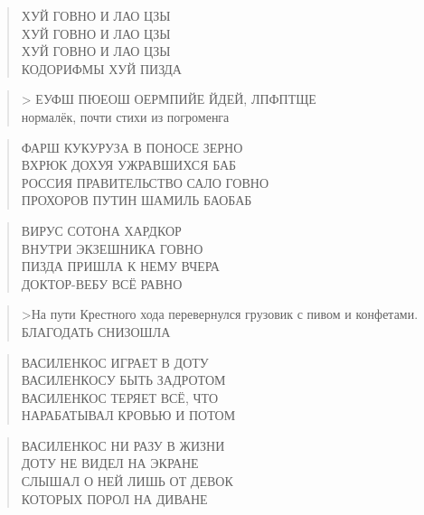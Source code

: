\poemtitle{***}
\begin{verse}
ХУЙ ГОВНО И ЛАО ЦЗЫ\\
ХУЙ ГОВНО И ЛАО ЦЗЫ\\
ХУЙ ГОВНО И ЛАО ЦЗЫ\\
КОДОРИФМЫ ХУЙ ПИЗДА
\end{verse}

\poemtitle{***}
\begin{verse}
> ЕУФШ ПЮЕОШ ОЕРМПИЙЕ ЙДЕЙ, ЛПФПТЩЕ\\
нормалёк, почти стихи из погроменга
\end{verse}

\poemtitle{***}
\begin{verse}
ФАРШ КУКУРУЗА В ПОНОСЕ ЗЕРНО\\
ВХРЮК ДОХУЯ УЖРАВШИХСЯ БАБ\\
РОССИЯ ПРАВИТЕЛЬСТВО САЛО ГОВНО\\
ПРОХОРОВ ПУТИН ШАМИЛЬ БАОБАБ
\end{verse}

\poemtitle{***}
\begin{verse}
ВИРУС СОТОНА ХАРДКОР\\
ВНУТРИ ЭКЗЕШНИКА ГОВНО\\
ПИЗДА ПРИШЛА К НЕМУ ВЧЕРА\\
ДОКТОР-ВЕБУ ВСЁ РАВНО
\end{verse}

\poemtitle{***}
\begin{verse}
>На пути Крестного хода перевернулся грузовик с пивом и конфетами.\\
БЛАГОДАТЬ СНИЗОШЛА
\end{verse}

\poemtitle{***}
\begin{verse}
ВАСИЛЕНКОС ИГРАЕТ В ДОТУ\\
ВАСИЛЕНКОСУ БЫТЬ ЗАДРОТОМ\\
ВАСИЛЕНКОС ТЕРЯЕТ ВСЁ, ЧТО\\
НАРАБАТЫВАЛ КРОВЬЮ И ПОТОМ
\end{verse}

\poemtitle{***}
\begin{verse}
ВАСИЛЕНКОС НИ РАЗУ В ЖИЗНИ\\
ДОТУ НЕ ВИДЕЛ НА ЭКРАНЕ\\
СЛЫШАЛ О НЕЙ ЛИШЬ ОТ ДЕВОК\\
КОТОРЫХ ПОРОЛ НА ДИВАНЕ
\end{verse}

